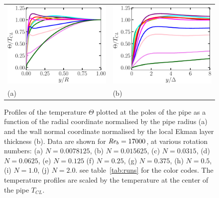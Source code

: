 \documentclass[lineno]{jfm}
\begin{document}
        \begin{figure}
        \centering
                \begin{tabular}{ll}
                \includegraphics[width=5.cm]{Figures/ekman_profsyr_roty_500_T.eps} &
                \includegraphics[width=5.cm]{Figures/ekman_profsyd_roty_500_T.eps} \\ 
			(a) & (b) \\
                \end{tabular}
        \caption{
                Profiles of
		the temperature $\Theta$ plotted at the poles of the pipe
                as a function of the radial coordinate normalised by the pipe radius (a) and the wall normal coordinate
                normalised by the local Ekman layer thickness (b).
                Data are shown for $\mbox{\textit{Re}}_b=17000$, at various rotation numbers:
                (a) $N = 0.0078125$,
                (b) $N = 0.015625$,
                (c) $N = 0.0315$,
                (d) $N = 0.0625$,
                (e) $N = 0.125$
                (f) $N = 0.25$,
                (g) $N = 0.375$,
                (h) $N = 0.5$,
                (i) $N = 1.0$,
                (j) $N = 2.0$.
		see table~\ref{tab:runs} for the color codes.
                The temperature profiles are scaled by the
                temperature at the center of the pipe $T_{CL}$.
        }
                \label{fig:Ekman_T_500}
        \end{figure}
\end{document}
